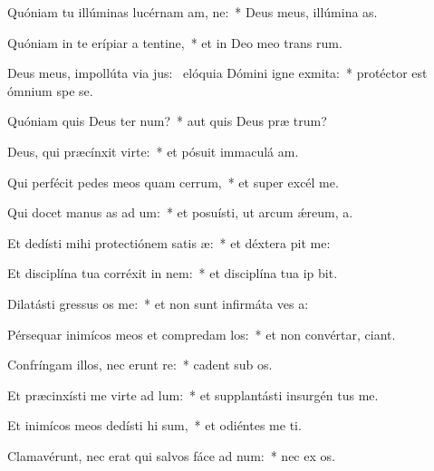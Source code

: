 \item Quóniam tu illúminas lucérnam am, ne:~* Deus meus, illúmina  as.
\item Quóniam in te erípiar a tentine,~* et in Deo meo trans rum.
\item Deus meus, impollúta via jus:~\pscross{} elóquia Dómini igne exmita:~* protéctor est ómnium spe  se.
\item Quóniam quis Deus ter num?~* aut quis Deus præ  trum?
\item Deus, qui præcínxit  virte:~* et pósuit immaculá  am.
\item Qui perfécit pedes meos quam cerrum,~* et super excél  me.
\item Qui docet manus as ad um:~* et posuísti, ut arcum ǽreum,  a.
\item Et dedísti mihi protectiónem satis æ:~* et déxtera  pit me:
\item Et disciplína tua corréxit  in nem:~* et disciplína tua ip  bit.
\item Dilatásti gressus os  me:~* et non sunt infirmáta ves a:
\item Pérsequar inimícos meos et compredam los:~* et non convértar,  ciant.
\item Confríngam illos, nec erunt re:~* cadent sub  os.
\item Et præcinxísti me virte ad lum:~* et supplantásti insurgén   tus me.
\item Et inimícos meos dedísti hi sum,~* et odiéntes me ti.
\item Clamavérunt, nec erat qui salvos fáce ad num:~* nec ex os.
